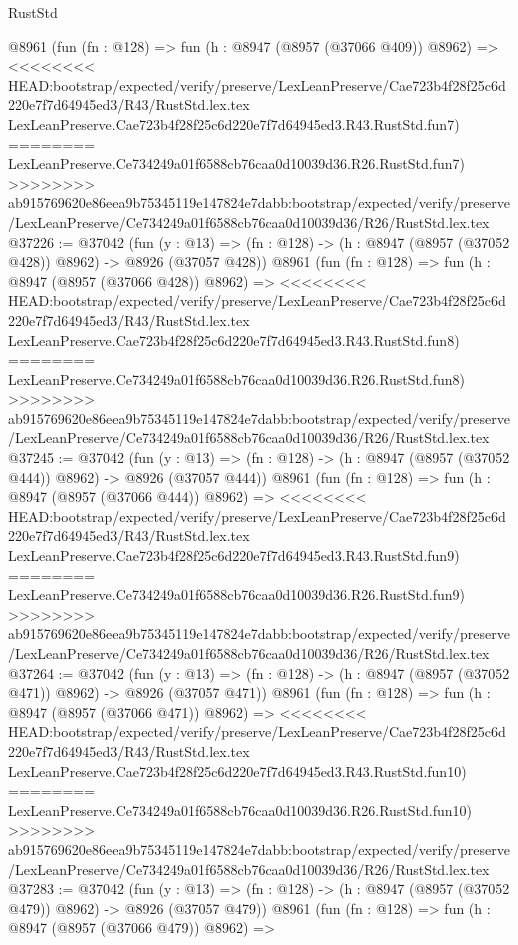 \begin{lexlean}{RustStd}
\begin{coremodule}
{\begin{coremodule}
{{{{{{{{{{{{{{{{{{{{{{{{{{{{{{{{{{{{{{{    @8961
    (fun (fn : @128) =>
    fun (h : @8947 (@8957 (@37066 @409)) @8962) =>
<<<<<<<< HEAD:bootstrap/expected/verify/preserve/LexLeanPreserve/Cae723b4f28f25c6d220e7f7d64945ed3/R43/RustStd.lex.tex
    LexLeanPreserve.Cae723b4f28f25c6d220e7f7d64945ed3.R43.RustStd.fun7)
========
    LexLeanPreserve.Ce734249a01f6588cb76caa0d10039d36.R26.RustStd.fun7)
>>>>>>>> ab915769620e86eea9b75345119e147824e7dabb:bootstrap/expected/verify/preserve/LexLeanPreserve/Ce734249a01f6588cb76caa0d10039d36/R26/RustStd.lex.tex
@37226 := @37042
    (fun (y : @13) => (fn : @128) -> (h : @8947 (@8957 (@37052 @428)) @8962) -> @8926 (@37057 @428))
    @8961
    (fun (fn : @128) =>
    fun (h : @8947 (@8957 (@37066 @428)) @8962) =>
<<<<<<<< HEAD:bootstrap/expected/verify/preserve/LexLeanPreserve/Cae723b4f28f25c6d220e7f7d64945ed3/R43/RustStd.lex.tex
    LexLeanPreserve.Cae723b4f28f25c6d220e7f7d64945ed3.R43.RustStd.fun8)
========
    LexLeanPreserve.Ce734249a01f6588cb76caa0d10039d36.R26.RustStd.fun8)
>>>>>>>> ab915769620e86eea9b75345119e147824e7dabb:bootstrap/expected/verify/preserve/LexLeanPreserve/Ce734249a01f6588cb76caa0d10039d36/R26/RustStd.lex.tex
@37245 := @37042
    (fun (y : @13) => (fn : @128) -> (h : @8947 (@8957 (@37052 @444)) @8962) -> @8926 (@37057 @444))
    @8961
    (fun (fn : @128) =>
    fun (h : @8947 (@8957 (@37066 @444)) @8962) =>
<<<<<<<< HEAD:bootstrap/expected/verify/preserve/LexLeanPreserve/Cae723b4f28f25c6d220e7f7d64945ed3/R43/RustStd.lex.tex
    LexLeanPreserve.Cae723b4f28f25c6d220e7f7d64945ed3.R43.RustStd.fun9)
========
    LexLeanPreserve.Ce734249a01f6588cb76caa0d10039d36.R26.RustStd.fun9)
>>>>>>>> ab915769620e86eea9b75345119e147824e7dabb:bootstrap/expected/verify/preserve/LexLeanPreserve/Ce734249a01f6588cb76caa0d10039d36/R26/RustStd.lex.tex
@37264 := @37042
    (fun (y : @13) => (fn : @128) -> (h : @8947 (@8957 (@37052 @471)) @8962) -> @8926 (@37057 @471))
    @8961
    (fun (fn : @128) =>
    fun (h : @8947 (@8957 (@37066 @471)) @8962) =>
<<<<<<<< HEAD:bootstrap/expected/verify/preserve/LexLeanPreserve/Cae723b4f28f25c6d220e7f7d64945ed3/R43/RustStd.lex.tex
    LexLeanPreserve.Cae723b4f28f25c6d220e7f7d64945ed3.R43.RustStd.fun10)
========
    LexLeanPreserve.Ce734249a01f6588cb76caa0d10039d36.R26.RustStd.fun10)
>>>>>>>> ab915769620e86eea9b75345119e147824e7dabb:bootstrap/expected/verify/preserve/LexLeanPreserve/Ce734249a01f6588cb76caa0d10039d36/R26/RustStd.lex.tex
@37283 := @37042
    (fun (y : @13) => (fn : @128) -> (h : @8947 (@8957 (@37052 @479)) @8962) -> @8926 (@37057 @479))
    @8961
    (fun (fn : @128) =>
    fun (h : @8947 (@8957 (@37066 @479)) @8962) =>
}}}}}}}}}}}}}}}}}}}}}}}}}}}}}}}}}}}}}}}
\end{coremodule}}
\end{coremodule}
\end{lexlean}
